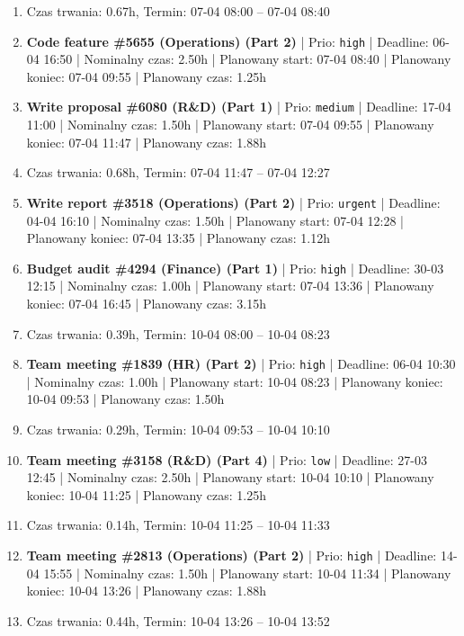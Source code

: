 {\begin{enumerate}
  \item [\textbf{PRZERWA}] Czas trwania: 0.67h, Termin: 07-04 08:00 -- 07-04 08:40
  \item [\textbf{14626}] \textbf{Code feature \#5655 (Operations) (Part 2)} | Prio: \texttt{high} | Deadline: 06-04 16:50 | Nominalny czas: 2.50h | Planowany start: 07-04 08:40 | Planowany koniec: 07-04 09:55 | Planowany czas: 1.25h
  \item [\textbf{14669}] \textbf{Write proposal \#6080 (R\&D) (Part 1)} | Prio: \texttt{medium} | Deadline: 17-04 11:00 | Nominalny czas: 1.50h | Planowany start: 07-04 09:55 | Planowany koniec: 07-04 11:47 | Planowany czas: 1.88h
  \item [\textbf{PRZERWA}] Czas trwania: 0.68h, Termin: 07-04 11:47 -- 07-04 12:27
  \item [\textbf{14598}] \textbf{Write report \#3518 (Operations) (Part 2)} | Prio: \texttt{urgent} | Deadline: 04-04 16:10 | Nominalny czas: 1.50h | Planowany start: 07-04 12:28 | Planowany koniec: 07-04 13:35 | Planowany czas: 1.12h
  \item [\textbf{14619}] \textbf{Budget audit \#4294 (Finance) (Part 1)} | Prio: \texttt{high} | Deadline: 30-03 12:15 | Nominalny czas: 1.00h | Planowany start: 07-04 13:36 | Planowany koniec: 07-04 16:45 | Planowany czas: 3.15h
  \item [\textbf{PRZERWA}] Czas trwania: 0.39h, Termin: 10-04 08:00 -- 10-04 08:23
  \item [\textbf{14610}] \textbf{Team meeting \#1839 (HR) (Part 2)} | Prio: \texttt{high} | Deadline: 06-04 10:30 | Nominalny czas: 1.00h | Planowany start: 10-04 08:23 | Planowany koniec: 10-04 09:53 | Planowany czas: 1.50h
  \item [\textbf{PRZERWA}] Czas trwania: 0.29h, Termin: 10-04 09:53 -- 10-04 10:10
  \item [\textbf{14688}] \textbf{Team meeting \#3158 (R\&D) (Part 4)} | Prio: \texttt{low} | Deadline: 27-03 12:45 | Nominalny czas: 2.50h | Planowany start: 10-04 10:10 | Planowany koniec: 10-04 11:25 | Planowany czas: 1.25h
  \item [\textbf{PRZERWA}] Czas trwania: 0.14h, Termin: 10-04 11:25 -- 10-04 11:33
  \item [\textbf{14617}] \textbf{Team meeting \#2813 (Operations) (Part 2)} | Prio: \texttt{high} | Deadline: 14-04 15:55 | Nominalny czas: 1.50h | Planowany start: 10-04 11:34 | Planowany koniec: 10-04 13:26 | Planowany czas: 1.88h
  \item [\textbf{PRZERWA}] Czas trwania: 0.44h, Termin: 10-04 13:26 -- 10-04 13:52

\end{enumerate}}
